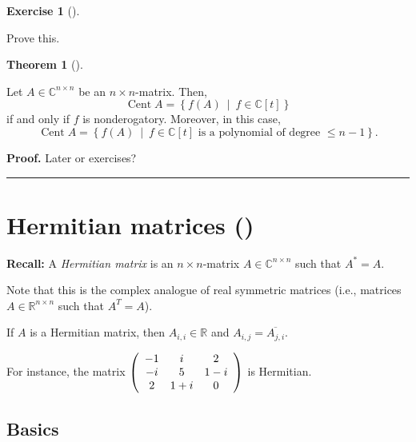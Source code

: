 \documentclass[numbers=enddot,12pt,final,onecolumn,notitlepage]{scrartcl}%
\newcounter{exer}
\numberwithin{exer}{subsection}
\theoremstyle{definition}
\newtheorem{theo}{Theorem}[subsection]
\newenvironment{theorem}[1][]
{\begin{theo}[#1]\begin{leftbar}}
{\end{leftbar}\end{theo}}
\newtheorem{exmp}[exer]{Exercise}
\newenvironment{exercise}[1][]
{\begin{exmp}[#1]\begin{leftbar}}
{\end{leftbar}\end{exmp}}
\newenvironment{proof}[1][Proof]{\noindent\textbf{#1.} }{\ \rule{0.5em}{0.5em}}
\begin{document}
\begin{exercise}
 Prove this.
\end{exercise}

\begin{theorem}
Let $A\in\mathbb{C}^{n\times n}$ be an $n\times n$-matrix. Then,
\[
\operatorname*{Cent}A=\left\{  f\left(  A\right)  \ \mid\ f\in\mathbb{C}%
\left[  t\right]  \right\}
\]
if and only if $f$ is nonderogatory. Moreover, in this case,%
\[
\operatorname*{Cent}A=\left\{  f\left(  A\right)  \ \mid\ f\in\mathbb{C}%
\left[  t\right]  \text{ is a polynomial of degree }\leq n-1\right\}  .
\]

\end{theorem}

\begin{proof}
Later or exercises?
\end{proof}

\section{Hermitian matrices (\cite[Chapter 4]{HorJoh13})}

\textbf{Recall:} A \emph{Hermitian matrix} is an $n\times n$-matrix
$A\in\mathbb{C}^{n\times n}$ such that $A^{\ast}=A$.

Note that this is the complex analogue of real symmetric matrices (i.e.,
matrices $A\in\mathbb{R}^{n\times n}$ such that $A^{T}=A$).

If $A$ is a Hermitian matrix, then $A_{i,i}\in\mathbb{R}$ and $A_{i,j}%
=\overline{A_{j,i}}$.

For instance, the matrix $\left(
\begin{array}
[c]{ccc}%
-1 & i & 2\\
-i & 5 & 1-i\\
2 & 1+i & 0
\end{array}
\right)  $ is Hermitian.

\subsection{Basics}
\end{document}
